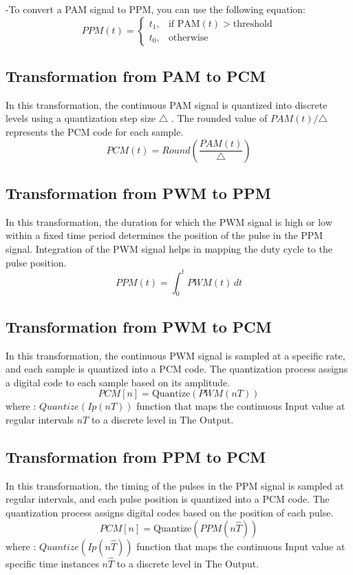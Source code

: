 \documentclass{IEEEtran}
\begin{document}
	-To convert a PAM signal to PPM, you can use the following equation:
	\begin{equation}
	{PPM}(t) = 
	\begin{cases}
		t_1, & \text{if } \text{PAM}(t) > \text{threshold} \\
		t_0, & \text{otherwise}
	\end{cases}
	\end{equation}
	\subsection{Transformation from PAM to PCM}
	
	In this transformation, the continuous PAM signal is quantized into discrete levels using a quantization step size $\triangle$ . The rounded value of $PAM(t)/\triangle$ represents the PCM code for each sample.
	\begin{equation}
		PCM(t) = Round (\frac{PAM(t)}{\triangle})
	\end{equation}
	\subsection{Transformation from PWM to PPM}
		In this transformation, the duration for which the PWM signal is high or low within a fixed time period determines the position of the pulse in the PPM signal. Integration of the PWM signal helps in mapping the duty cycle to the pulse position.
	\begin{equation}
		{PPM}(t) = \int_{0}^{t} {PWM}(t) \, dt
	\end{equation}
	
	\subsection{Transformation from PWM to PCM}
	 In this transformation, the continuous PWM signal is sampled at a specific rate, and each sample is quantized into a PCM code. The quantization process assigns a digital code to each sample based on its amplitude.
	 \begin{equation}
	 	{PCM}[n] = \text{Quantize}\left({PWM}(nT)\right)
	 \end{equation}
	 where : 
	 $Quantize(Ip(nT))$ function that maps the continuous Input value at regular intervals $nT$
	 to a discrete level in The Output.
	 
	 
	 
	\subsection{Transformation from PPM to PCM}
		In this transformation, the timing of the pulses in the PPM signal is sampled at regular intervals, and each pulse position is quantized into a PCM code. The quantization process assigns digital codes based on the position of each pulse.
	 \begin{equation}
		{PCM}[n] = \text{Quantize}\left({PPM}(n\hat{T})\right)
	\end{equation}
	where :
	$Quantize(Ip(n\hat{T}))$ function that maps the continuous Input value at specific time instances $n\hat{T}$ to a discrete level in The Output.
\end{document}
